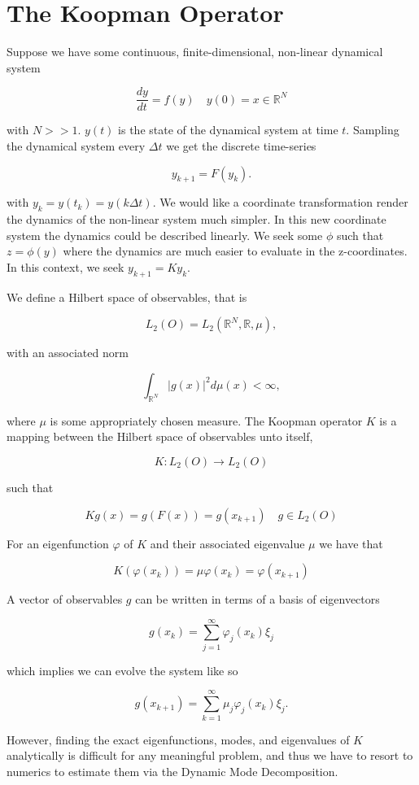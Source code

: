\section{The Koopman Operator}
Suppose we have some continuous, finite-dimensional, non-linear dynamical system 

$$
\frac{dy}{dt} = f(y) \quad y(0) = x \in \mathbb{R}^N
$$

\noindent with $N>>1$. $y(t)$ is the state of the dynamical system at time $t$. Sampling the dynamical
system every $\Delta t$ we get the discrete time-series

$$
y_{k+1} = F(y_k).
$$

\noindent with $y_k = y(t_k) = y(k \Delta t)$. We would like a coordinate transformation render the dynamics of the
 non-linear system much simpler. In this new coordinate system the dynamics could be
described linearly. We seek some $\phi$ such
that $z = \phi(y)$ where the dynamics are much easier to evaluate in the
 z-coordinates. In this context, we seek $y_{k+1} = Ky_k$.


 \noindent We define a Hilbert space of observables, that is 

$$
L_2(O) = L_2(\mathbb{R}^N, \mathbb{R}, \mu),
$$

\noindent with an associated norm 

$$
\int_{\mathbb{R}^N} |g(x) |^2 d\mu(x)  < \infty,
$$

\noindent where $\mu$ is some appropriately chosen measure. The Koopman
operator $K$ is a mapping between the Hilbert space of observables unto itself,

$$
K: L_2(O) \rightarrow L_2(O)
$$

\noindent such that

$$
Kg(x) = g(F(x)) = g(x_{k+1}) \quad g \in L_2(O)
$$

\noindent For an eigenfunction $\varphi$ of $K$ and their associated eigenvalue $\mu$ we have that 


$$
K(\varphi(x_k)) = \mu \varphi(x_k) = \varphi(x_{k+1})
$$

\noindent A vector of observables $g$ can be written in terms of a basis of eigenvectors

$$
g(x_{k}) = \sum^{\infty}_{j=1}\varphi_j(x_k) \xi_j
$$

\noindent which implies we can evolve the system like so

$$
g(x_{k+1}) = \sum^{\infty}_{k=1} \mu_j \varphi_j(x_k) \xi_j.
$$

\noindent However, finding the exact eigenfunctions, modes, and eigenvalues of $K$ analytically
is difficult for any meaningful problem, and thus we have to resort to
numerics to estimate them via the Dynamic Mode Decomposition.


